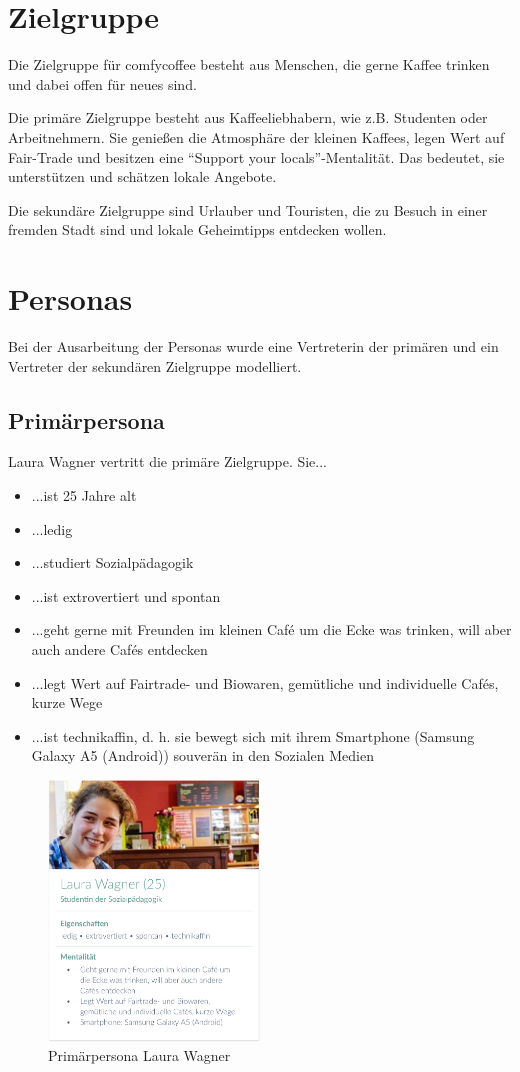 \section{Zielgruppe}
Die Zielgruppe für comfycoffee besteht aus Menschen, die gerne Kaffee trinken und dabei offen für neues sind.

Die primäre Zielgruppe besteht aus Kaffeeliebhabern, wie z.B. Studenten oder Arbeitnehmern. Sie genießen die Atmosphäre der kleinen Kaffees, legen Wert auf Fair-Trade und besitzen eine ``Support your locals''-Mentalität. Das bedeutet, sie unterstützen und schätzen lokale Angebote.

Die sekundäre Zielgruppe sind Urlauber und Touristen, die zu Besuch in einer fremden Stadt sind und lokale Geheimtipps entdecken wollen.

\section{Personas}
Bei der Ausarbeitung der Personas wurde eine Vertreterin der primären und ein Vertreter der sekundären Zielgruppe modelliert.

\subsection{Primärpersona}
Laura Wagner vertritt die primäre Zielgruppe. Sie...
\begin{itemize}
	\item ...ist 25 Jahre alt
	\item ...ledig
	\item ...studiert Sozialpädagogik
	\item ...ist extrovertiert und spontan
	\item ...geht gerne mit Freunden im kleinen Café um die Ecke was trinken, will aber auch andere Cafés entdecken
	\item ...legt Wert auf Fairtrade- und Biowaren, gemütliche und individuelle Cafés, kurze Wege
	\item ...ist technikaffin, d. h. sie bewegt sich mit ihrem Smartphone (Samsung Galaxy A5 (Android)) souverän in den Sozialen Medien
\end{itemize}

\begin{figure}[H]
    \centering
		\includegraphics[width=0.5\textwidth]{Bilder/laura.eps}
		\caption{Primärpersona Laura Wagner}
\end{figure}

